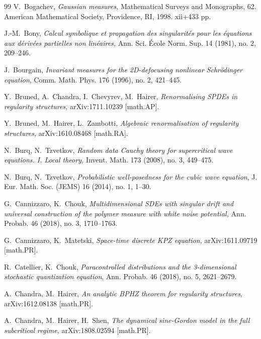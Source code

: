 \documentclass[%
11pt,  reqno]{amsart}
\newcommand{\1}{\hspace{0.2mm}\text{I}\hspace{0.2mm}}
\numberwithin{equation}{section}
\numberwithin{theorem}{section}
\begin{document}
\begin{thebibliography}{99}
V.~Bogachev, 
{\it Gaussian measures,}
 Mathematical Surveys and Monographs, 62. American Mathematical Society, Providence, RI, 1998. xii+433 pp.


J.-M.~Bony, 
{\it Calcul symbolique et propagation des singularit\'es pour les \'equations aux d\'eriv\'ees partielles non lin\'eaires,}
Ann. Sci. \'Ecole Norm. Sup.  14 (1981), no. 2, 209--246.


J.~Bourgain, 
{\it Invariant measures for the 2D-defocusing nonlinear Schr\"odinger equation}, 
Comm. Math. Phys. 176 (1996), no. 2, 421--445. 


Y.~Bruned, A.~Chandra, I.~Chevyrev, M.~Hairer,
{\it Renormalising {SPDEs} in regularity structures,}
arXiv:1711.10239 [math.AP].

Y.~Bruned, M.~Hairer, L.~Zambotti,
{\it Algebraic renormalisation of regularity structures,}
arXiv:1610.08468 [math.RA].




N.~Burq, N.~Tzvetkov,
{\it Random data Cauchy theory for supercritical wave equations. I. Local theory,}
Invent. Math. 173 (2008), no. 3, 449--475.



N.~Burq, N.~Tzvetkov,
{\it Probabilistic well-posedness for the cubic wave equation},
 J. Eur. Math. Soc. (JEMS)  16 (2014), no. 1, 1--30.

G.~Cannizzaro,  K.~Chouk,
{\it Multidimensional {SDE}s with singular drift and universal
  construction of the polymer measure with white noise potential,}
Ann. Probab. 46 (2018), no. 3, 1710--1763.



G.~Cannizzaro,  K.~Matetski,
{\it Space-time discrete {KPZ} equation,}
arXiv:1611.09719 
[math.PR].



R.~Catellier, K.~Chouk, 
{\it Paracontrolled distributions and the 3-dimensional stochastic quantization equation},
  Ann. Probab. 46 (2018), no. 5, 2621--2679.

A.~Chandra,  M.~Hairer,
{\it An analytic {BPHZ} theorem for regularity structures,}
arXiv:1612.08138 [math.PR].


A.~Chandra, M.~Hairer,  H.~Shen,
{\it
 The dynamical sine-{Gordon} model in the full subcritical regime,}
arXiv:1808.02594 [math.PR].





\end{thebibliography}
\end{document}
